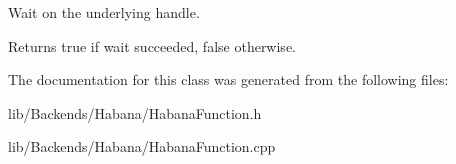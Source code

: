 Wait on the underlying handle. \begin{DoxyReturn}{Returns}
true if wait succeeded, false otherwise. 
\end{DoxyReturn}


The documentation for this class was generated from the following files\+:\begin{DoxyCompactItemize}
\item 
lib/\+Backends/\+Habana/Habana\+Function.\+h\item 
lib/\+Backends/\+Habana/Habana\+Function.\+cpp\end{DoxyCompactItemize}
